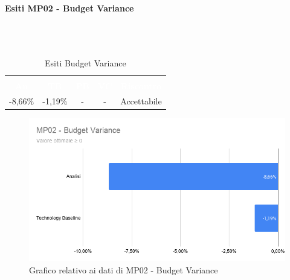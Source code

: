\paragraph{Esiti MP02 - Budget Variance} \mbox{} \\ \mbox{} \\
\begin{longtable}{c c c c c}
\rowcolor{white}\caption{Esiti Budget Variance} \\
		\rowcolor{redafk}
\textcolor{white}{\textbf{An}} &
\textcolor{white}{\textbf{TB}} &
\textcolor{white}{\textbf{PB}} &
\textcolor{white}{\textbf{VC}} &
\textcolor{white}{\textbf{Riscontro}} \\
-8,66$\%$ &
-1,19$\%$ &
- &
- &
Accettabile \\
\end{longtable}

\begin{figure}[H]
\centering
\includegraphics[scale=0.5]{./img/MP02_budget_variance.png}
\caption{Grafico relativo ai dati di MP02 - Budget Variance}
\end{figure}

